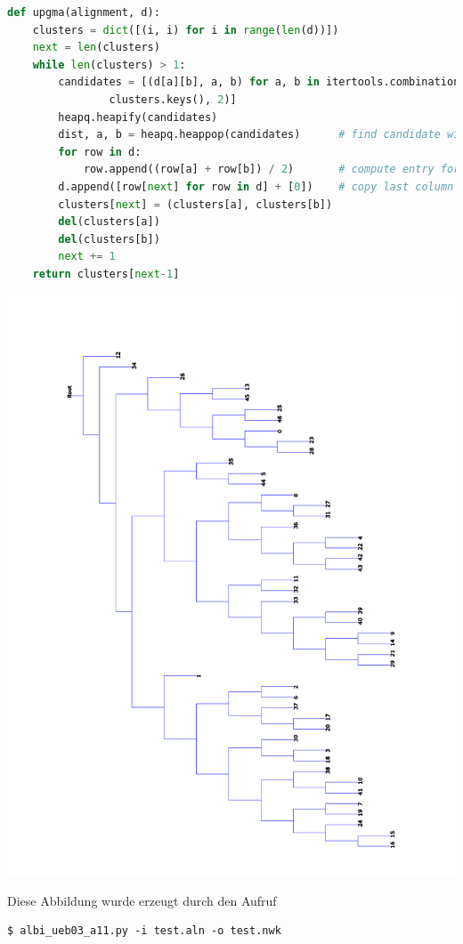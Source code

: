 \documentclass{homework}
\begin{document}
\begin{enumerate}
\begin{enumerate}
\begin{lstlisting}[language=python]
def upgma(alignment, d):
	clusters = dict([(i, i) for i in range(len(d))])
	next = len(clusters)
	while len(clusters) > 1:
		candidates = [(d[a][b], a, b) for a, b in itertools.combinations(
				clusters.keys(), 2)]
		heapq.heapify(candidates)
		dist, a, b = heapq.heappop(candidates)		# find candidate with least distance
		for row in d:
			row.append((row[a] + row[b]) / 2)		# compute entry for new column
		d.append([row[next] for row in d] + [0])	# copy last column to new row
		clusters[next] = (clusters[a], clusters[b])
		del(clusters[a])
		del(clusters[b])
		next += 1
	return clusters[next-1]
\end{lstlisting}

\includegraphics[angle=270,width=\linewidth]{u3_aufg3_tree.pdf}

Diese Abbildung wurde erzeugt durch den Aufruf
\begin{verbatim}
$ albi_ueb03_a11.py -i test.aln -o test.nwk
\end{verbatim}


\end{enumerate}
\end{enumerate}
\end{document}

